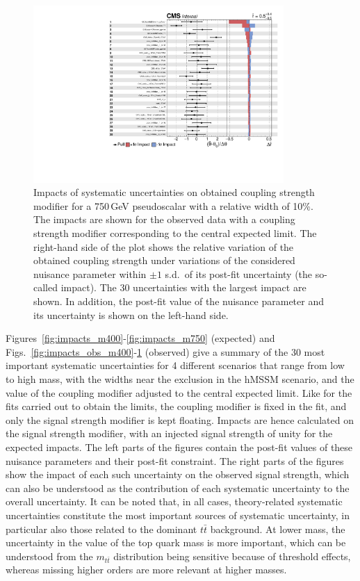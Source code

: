 \begin{figure}[!Hhtb]
\centering
\includegraphics[width=0.85\textwidth,keepaspectratio=true]{fig/app5/impacts/impacts_750_obs.pdf}
\caption{Impacts of systematic uncertainties on obtained coupling strength modifier for a 750\,GeV pseudoscalar with a relative width of 10\%. The impacts are shown for the observed data with a coupling strength modifier corresponding to the central expected limit. The right-hand side of the plot shows the relative variation of the obtained coupling strength under variations of the considered nuisance parameter within $\pm 1$ s.d.\ of its post-fit uncertainty (the so-called impact). The 30 uncertainties with the largest impact are shown. In addition, the post-fit value of the nuisance parameter and its uncertainty is shown on the left-hand side.}
\label{fig:impacts_obs_m750}
\end{figure}


Figures~\ref{fig:impacts_m400}-\ref{fig:impacts_m750} (expected) and Figs.\ \ref{fig:impacts_obs_m400}-\ref{fig:impacts_obs_m750} (observed) give a summary of the 30 most important systematic uncertainties for 4 different scenarios that range from low to high mass, with the widths near the exclusion in the hMSSM scenario, and the value of the coupling modifier adjusted to the central expected limit.
Like for the fits carried out to obtain the limits, the coupling modifier is fixed in the fit, and only the signal strength modifier is kept floating.
Impacts are hence calculated on the signal strength modifier, with an injected signal strength of unity for the expected impacts.
The left parts of the figures contain the post-fit values of these nuisance parameters and their post-fit constraint.
The right parts of the figures show the impact of each such uncertainty on the observed signal strength, which can also be understood as the contribution of each systematic uncertainty to the overall uncertainty.
It can be noted that, in all cases, theory-related systematic uncertainties constitute the most important sources of systematic uncertainty, in particular also those related to the dominant $t\bar t$ background.
At lower mass, the uncertainty in the value of the top quark mass is more important, which can be understood from the $m_{t\bar t}$ distribution being sensitive because of threshold effects, whereas missing higher orders are more relevant at higher masses.


